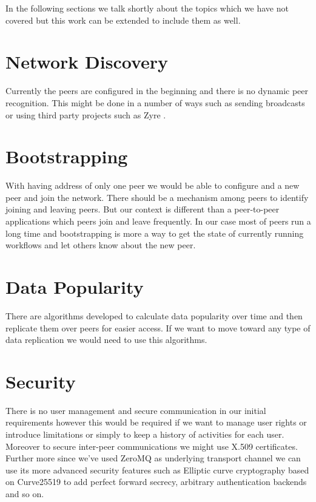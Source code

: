 In the following sections we talk shortly about the topics which we have
not covered but this work can be extended to include them as well.
%


\section{Network Discovery}
Currently the peers are configured in the beginning and there is no dynamic peer recognition. This might be done in a number of ways
such as sending broadcasts or using third party projects such as Zyre \cite{Zyre}.

\section{Bootstrapping}
With having address of only one peer we would be able to configure and a new peer and join the network. There should be a mechanism among
peers to identify joining and leaving peers. But our context is different than a peer-to-peer applications which peers join and leave 
frequently. In our case most of peers run a long time and bootstrapping is more a way to get the state of currently running workflows and
let others know about the new peer.

\section{Data Popularity}
There are algorithms developed to calculate data popularity over time and then replicate them over peers for easier access. If we want to 
move toward any type of data replication we would need to use this algorithms.

\section{Security}
There is no user management and secure communication in our initial requirements however this would be required if we want to manage user
rights or introduce limitations or simply to keep a history of activities for each user. Moreover to secure inter-peer communications 
we might use X.509 certificates. Further more since we've used ZeroMQ\cite{ZeroMQ} as underlying transport channel we can use its more advanced
security features such as Elliptic curve cryptography\cite{Curve} based on Curve25519\cite{Curve25519} to add perfect forward secrecy, 
arbitrary authentication backends and so on.

